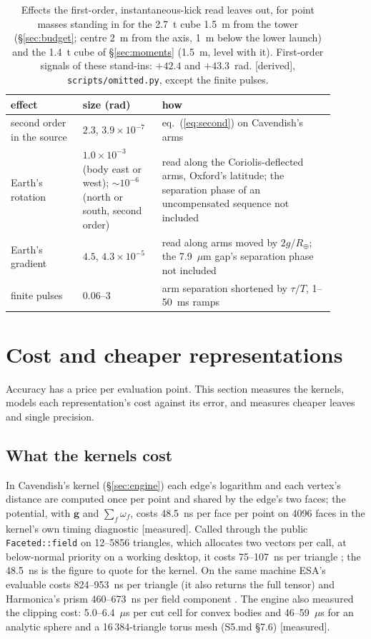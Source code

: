 \documentclass[10pt,a4paper]{article}
\newcommand{\tagM}{\textsf{\small[measured]}}
\newcommand{\tagD}{\textsf{\small[derived]}}
\begin{document}
\begin{table}[tbp]\centering\small
\caption{Effects the first-order, instantaneous-kick read leaves out, for point masses standing in
for the 2.7~t cube 1.5~m from the tower (\S\ref{sec:budget}; centre 2~m from the axis, 1~m below the
lower launch) and the 1.4~t cube of \S\ref{sec:moments} (1.5~m, level with it). First-order signals
of these stand-ins: $+42.4$ and $+43.3$~rad. \tagD, \texttt{scripts/omitted.py}, except the finite
pulses.}\label{tab:omitted}
\begin{tabular}{>{\raggedright}p{0.2\linewidth}>{\raggedright}p{0.22\linewidth}>{\raggedright\arraybackslash}p{0.48\linewidth}}\toprule
effect & size (rad) & how\\\midrule
second order in the source & $2.3$, $3.9\times10^{-7}$ & eq.~(\ref{eq:second}) on Cavendish's arms\\
Earth's rotation & $1.0\times10^{-3}$ (body east or west); $\sim10^{-6}$ (north or south, second order) & read along the Coriolis-deflected arms, Oxford's latitude; the separation phase of an uncompensated sequence not included\\
Earth's gradient & $4.5$, $4.3\times10^{-5}$ & read along arms moved by $2g/R_\oplus$; the 7.9~$\mu$m gap's separation phase not included\\
finite pulses & 0.06--3 & arm separation shortened by $\tau/T$, 1--50~ms ramps \citep[\S1]{paperflight}\\\bottomrule
\end{tabular}
\end{table}

\section{Cost and cheaper representations}\label{sec:cost}

Accuracy has a price per evaluation point. This section measures the kernels, models each
representation's cost against its error, and measures cheaper leaves and single precision.

\subsection{What the kernels cost}\label{sec:kcost}

In Cavendish's kernel (\S\ref{sec:engine}) each edge's
logarithm and each vertex's distance are computed once per point and shared by the edge's two faces;
the potential, with $\mathbf{g}$ and $\sum_f\omega_f$, costs 48.5~ns per face per point on 4096 faces
in the kernel's own timing diagnostic \tagM. Called through the public \texttt{Faceted::field} on
12--5856 triangles, which allocates two vectors per call, at below-normal priority on a working
desktop, it costs 75--107~ns per triangle \citep[Table~D]{paperbench}; the 48.5~ns is the figure to
quote for the kernel. On the same machine ESA's evaluable costs 824--953~ns per triangle (it also returns the
full tensor) and Harmonica's prism 460--673~ns per field component \citep[Table~D]{paperbench}. The engine also measured the clipping cost:
5.0--6.4~$\mu$s per cut cell for convex bodies and 46--59~$\mu$s for an analytic sphere and a
16\,384-triangle torus mesh (S5.md \S7.6) \tagM.
\end{document}
